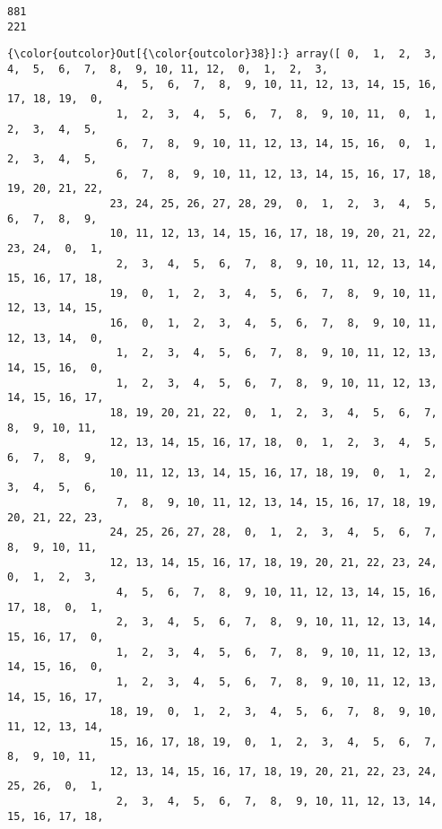 \documentclass[11pt]{article}
\begin{document}
    \begin{Verbatim}[commandchars=\\\{\}]
881
221

    \end{Verbatim}

\begin{Verbatim}[commandchars=\\\{\}]
{\color{outcolor}Out[{\color{outcolor}38}]:} array([ 0,  1,  2,  3,  4,  5,  6,  7,  8,  9, 10, 11, 12,  0,  1,  2,  3,
                 4,  5,  6,  7,  8,  9, 10, 11, 12, 13, 14, 15, 16, 17, 18, 19,  0,
                 1,  2,  3,  4,  5,  6,  7,  8,  9, 10, 11,  0,  1,  2,  3,  4,  5,
                 6,  7,  8,  9, 10, 11, 12, 13, 14, 15, 16,  0,  1,  2,  3,  4,  5,
                 6,  7,  8,  9, 10, 11, 12, 13, 14, 15, 16, 17, 18, 19, 20, 21, 22,
                23, 24, 25, 26, 27, 28, 29,  0,  1,  2,  3,  4,  5,  6,  7,  8,  9,
                10, 11, 12, 13, 14, 15, 16, 17, 18, 19, 20, 21, 22, 23, 24,  0,  1,
                 2,  3,  4,  5,  6,  7,  8,  9, 10, 11, 12, 13, 14, 15, 16, 17, 18,
                19,  0,  1,  2,  3,  4,  5,  6,  7,  8,  9, 10, 11, 12, 13, 14, 15,
                16,  0,  1,  2,  3,  4,  5,  6,  7,  8,  9, 10, 11, 12, 13, 14,  0,
                 1,  2,  3,  4,  5,  6,  7,  8,  9, 10, 11, 12, 13, 14, 15, 16,  0,
                 1,  2,  3,  4,  5,  6,  7,  8,  9, 10, 11, 12, 13, 14, 15, 16, 17,
                18, 19, 20, 21, 22,  0,  1,  2,  3,  4,  5,  6,  7,  8,  9, 10, 11,
                12, 13, 14, 15, 16, 17, 18,  0,  1,  2,  3,  4,  5,  6,  7,  8,  9,
                10, 11, 12, 13, 14, 15, 16, 17, 18, 19,  0,  1,  2,  3,  4,  5,  6,
                 7,  8,  9, 10, 11, 12, 13, 14, 15, 16, 17, 18, 19, 20, 21, 22, 23,
                24, 25, 26, 27, 28,  0,  1,  2,  3,  4,  5,  6,  7,  8,  9, 10, 11,
                12, 13, 14, 15, 16, 17, 18, 19, 20, 21, 22, 23, 24,  0,  1,  2,  3,
                 4,  5,  6,  7,  8,  9, 10, 11, 12, 13, 14, 15, 16, 17, 18,  0,  1,
                 2,  3,  4,  5,  6,  7,  8,  9, 10, 11, 12, 13, 14, 15, 16, 17,  0,
                 1,  2,  3,  4,  5,  6,  7,  8,  9, 10, 11, 12, 13, 14, 15, 16,  0,
                 1,  2,  3,  4,  5,  6,  7,  8,  9, 10, 11, 12, 13, 14, 15, 16, 17,
                18, 19,  0,  1,  2,  3,  4,  5,  6,  7,  8,  9, 10, 11, 12, 13, 14,
                15, 16, 17, 18, 19,  0,  1,  2,  3,  4,  5,  6,  7,  8,  9, 10, 11,
                12, 13, 14, 15, 16, 17, 18, 19, 20, 21, 22, 23, 24, 25, 26,  0,  1,
                 2,  3,  4,  5,  6,  7,  8,  9, 10, 11, 12, 13, 14, 15, 16, 17, 18,

\end{Verbatim}
\end{document}
